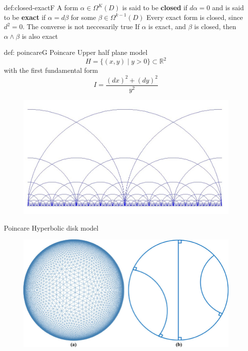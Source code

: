 \documentclass[landscape, 8pt]{extarticle}
\begin{document}
\begin{multicols}{3}
\begin{dfn}{def:closed-exact}{F}
A form \(\alpha\in \Omega^{K}(D)\) is said to be \textbf{closed} if \(d\alpha = 0\) and is said to be \textbf{exact} if \(\alpha = d\beta\) for some \(\beta\in \Omega^{k-1}(D)\)\newline
Every exact form is closed, since \(d^{2} = 0\). The converse is not neccesarily true\newline
If \(\alpha\) is exact, and \(\beta\) is closed, then \(\alpha \wedge \beta\) is also exact

\end{dfn}

\begin{dfn}{def: poincare}{G}
    Poincare Upper half plane model
    \[H = \{(x,y) \mid y > 0\}\subset \mathbb{R}^{2}\]
    with the first fundamental form
    \[I = \frac{(dx)^{2} + (dy)^{2}}{y^{2}}\]
    \begin{figure}[H]
        \centering
        \includegraphics[width=\linewidth]{images/halfplane1.jpg}
    \end{figure}
    
    Poincare Hyperbolic disk model
    \begin{figure}[H]
        \centering
        \includegraphics[width=\linewidth]{images/diskmodel.jpg}
    \end{figure}
\end{dfn}


\end{multicols}
\end{document}
